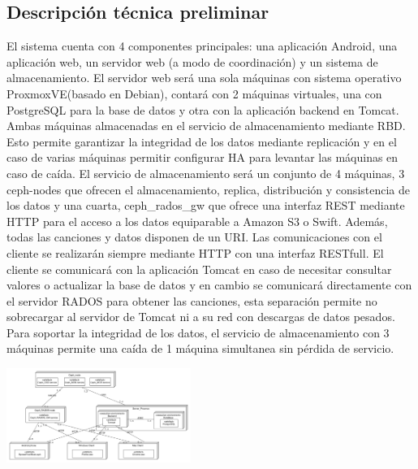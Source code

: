 \subsection{Descripci\'on t\'ecnica preliminar}
El sistema cuenta con 4 componentes principales: una aplicaci\'on Android, una aplicaci\'on web, un servidor web (a modo de coordinaci\'on) y un sistema de almacenamiento.
El servidor web ser\'a una sola m\'aquinas con sistema operativo ProxmoxVE(basado en Debian), contar\'a con 2 m\'aquinas virtuales, una con PostgreSQL para la base de datos y otra con la aplicaci\'on backend en Tomcat. Ambas m\'aquinas almacenadas en el servicio de almacenamiento mediante RBD. Esto permite garantizar la integridad de los datos mediante replicaci\'on y en el caso de varias m\'aquinas permitir configurar HA para levantar las m\'aquinas en caso de ca\'ida.
El servicio de almacenamiento ser\'a un conjunto de 4 m\'aquinas, 3 ceph-nodes que ofrecen el almacenamiento, replica, distribuci\'on y consistencia de los datos y una cuarta, ceph\_rados\_gw que ofrece una interfaz REST mediante HTTP para el acceso a los datos equiparable a Amazon S3 o Swift. Adem\'as, todas las canciones y datos disponen de un URI.
Las comunicaciones con el cliente se realizar\'an siempre mediante HTTP con una interfaz RESTfull. El cliente se comunicar\'a con la aplicaci\'on Tomcat en caso de necesitar consultar valores o actualizar la base de datos y en cambio se comunicar\'a directamente con el servidor RADOS para obtener las canciones, esta separaci\'on permite no sobrecargar al servidor de Tomcat ni a su red con descargas de datos pesados.
Para soportar la integridad de los datos, el servicio de almacenamiento con 3 m\'aquinas permite una ca\'ida de 1 m\'aquina simultanea sin p\'erdida de servicio.

\includegraphics[width=6cm]{Figures/deployment.png}